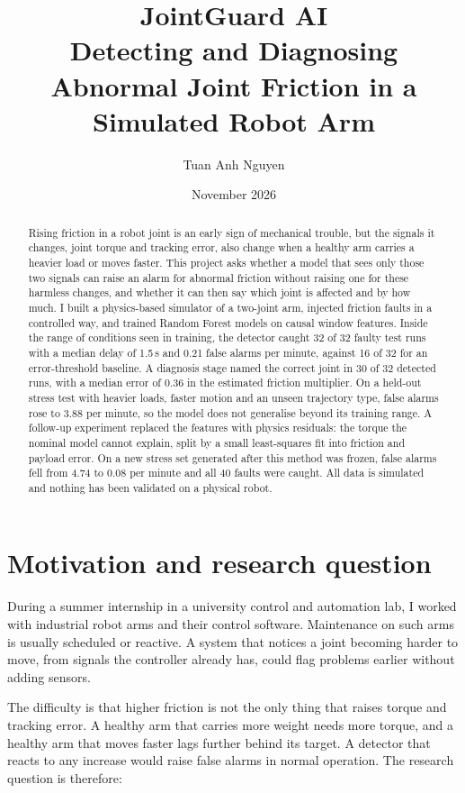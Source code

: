 \documentclass[11pt,a4paper]{article}
\title{\textbf{JointGuard AI}\\[4pt]
\large Detecting and Diagnosing Abnormal Joint Friction in a Simulated Robot Arm}
\author{Tuan Anh Nguyen}
\date{November 2026}
\begin{document}
\maketitle

\begin{abstract}
\noindent
Rising friction in a robot joint is an early sign of mechanical trouble, but the signals it changes, joint torque and
tracking error, also change when a healthy arm carries a heavier load or moves faster. This project asks whether a
model that sees only those two signals can raise an alarm for abnormal friction without raising one for these
harmless changes, and whether it can then say which joint is affected and by how much. I built a physics-based
simulator of a two-joint arm, injected friction faults in a controlled way, and trained Random Forest models on
causal window features. Inside the range of conditions seen in training, the detector caught 32 of 32 faulty test
runs with a median delay of 1.5\,s and 0.21 false alarms per minute, against 16 of 32 for an error-threshold
baseline. A diagnosis stage named the correct joint in 30 of 32 detected runs, with a median error of 0.36 in the
estimated friction multiplier. On a held-out stress test with heavier loads, faster motion and an unseen trajectory
type, false alarms rose to 3.88 per minute, so the model does not generalise beyond its training range. A follow-up
experiment replaced the features with physics residuals: the torque the nominal model cannot explain, split by a small
least-squares fit into friction and payload error. On a new stress set generated after this method was frozen, false
alarms fell from 4.74 to 0.08 per minute and all 40 faults were caught. All data is simulated and nothing has been
validated on a physical robot.
\end{abstract}

\section{Motivation and research question}
During a summer internship in a university control and automation lab, I worked with industrial robot arms and their
control software. Maintenance on such arms is usually scheduled or reactive. A system that notices a joint becoming
harder to move, from signals the controller already has, could flag problems earlier without adding sensors.

The difficulty is that higher friction is not the only thing that raises torque and tracking error. A healthy arm
that carries more weight needs more torque, and a healthy arm that moves faster lags further behind its target. A
detector that reacts to any increase would raise false alarms in normal operation. The research question is therefore:
\end{document}
